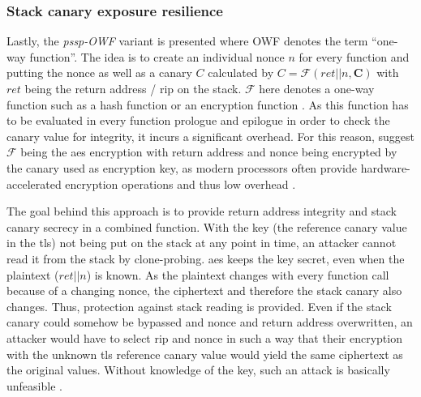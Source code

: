 \subsubsection{Stack canary exposure resilience}
\label{subsubsec:p-ssp-owf}

Lastly, the \emph{\acs{pssp}-OWF} variant is presented where OWF denotes the term ``one-way function''.
The idea is to create an individual nonce $ n $ for every function and putting the nonce as well as a canary $ C $ calculated by $ C = \mathcal{F} \left( ret || n, \textbf{C} \right) $ with $ ret $ being the return address / \gls{rip} on the stack.
$ \mathcal{F} $ here denotes a one-way function such as a hash function or an encryption function \cite[247\psq]{Wang2018}.
As this function has to be evaluated in every function prologue and epilogue in order to check the canary value for integrity, it incurs a significant overhead.
For this reason, \citeauthor{Wang2018} suggest $ \mathcal{F} $ being the \gls{aes} encryption with return address and nonce being encrypted by the canary used as encryption key, as modern processors often provide hardware-accelerated encryption operations and thus low overhead \cite[248,251]{Wang2018}.

The goal behind this approach is to provide return address integrity and stack canary secrecy in a combined function.
With the key (the reference canary value in the \gls{tls}) not being put on the stack at any point in time, an attacker cannot read it from the stack by clone-probing.
\Gls{aes} keeps the key secret, even when the plaintext ($ ret || n $) is known.
As the plaintext changes with every function call because of a changing nonce, the ciphertext and therefore the stack canary also changes.
Thus, protection against stack reading is provided.
Even if the stack canary could somehow be bypassed and nonce and return address overwritten, an attacker would have to select \gls{rip} and nonce in such a way that their encryption with the unknown \gls{tls} reference canary value would yield the same ciphertext as the original values.
Without knowledge of the key, such an attack is basically unfeasible \cite[251]{Wang2018}.

